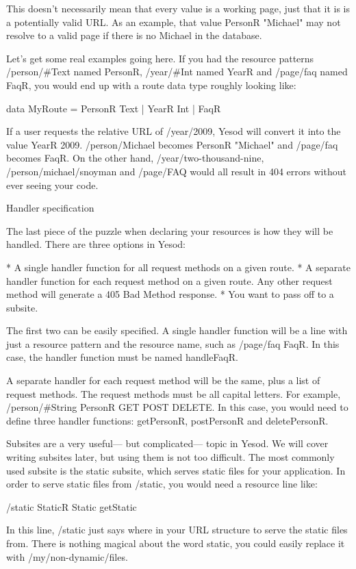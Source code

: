 This doesn't necessarily mean that every value is a working page, just
that it is is a potentially valid URL. As an example, that value
PersonR "Michael" may not resolve to a valid page if there is no
Michael in the database.

Let's get some real examples going here. If you had the resource
patterns /person/#Text named PersonR, /year/#Int named YearR and
/page/faq named FaqR, you would end up with a route data type roughly
looking like:

data MyRoute = PersonR Text
             | YearR Int
             | FaqR

If a user requests the relative URL of /year/2009, Yesod will convert
it into the value YearR 2009. /person/Michael becomes PersonR
"Michael" and /page/faq becomes FaqR. On the other hand,
/year/two-thousand-nine, /person/michael/snoyman and /page/FAQ would
all result in 404 errors without ever seeing your code.

Handler specification

The last piece of the puzzle when declaring your resources is how they
will be handled. There are three options in Yesod:

* A single handler function for all request methods on a given route.
* A separate handler function for each request method on a given route. Any other request method will generate a 405 Bad Method response.
* You want to pass off to a subsite.

The first two can be easily specified. A single handler function will
be a line with just a resource pattern and the resource name, such as
/page/faq FaqR. In this case, the handler function must be named
handleFaqR.

A separate handler for each request method will be the same, plus a
list of request methods. The request methods must be all capital
letters. For example, /person/#String PersonR GET POST DELETE. In this
case, you would need to define three handler functions: getPersonR,
postPersonR and deletePersonR.

Subsites are a very useful— but complicated— topic in Yesod. We will
cover writing subsites later, but using them is not too difficult. The
most commonly used subsite is the static subsite, which serves static
files for your application. In order to serve static files from
/static, you would need a resource line like:

/static StaticR Static getStatic

In this line, /static just says where in your URL structure to serve
the static files from. There is nothing magical about the word static,
you could easily replace it with /my/non-dynamic/files.

